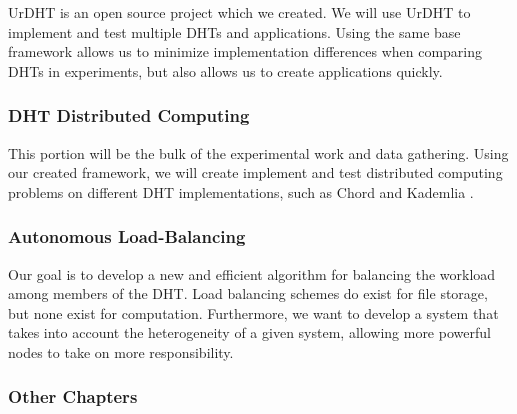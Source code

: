 UrDHT is an open source project which we created.
We will use UrDHT to implement and test multiple DHTs and applications.
Using the same base framework allows us to minimize implementation differences when comparing DHTs in experiments, but also allows us to create applications quickly.



\subsubsection{DHT Distributed Computing}

This portion will be the bulk of the experimental work and data gathering.
Using our created framework, we will create implement and test distributed computing problems on different DHT implementations, such as Chord \cite{chord} and Kademlia \cite{kademlia}.

\subsubsection{Autonomous Load-Balancing}
Our goal is to develop a new and efficient algorithm for balancing the workload among members of the DHT.
Load balancing schemes do exist for file storage, but none exist for computation.
Furthermore, we want to develop a system that takes into account the heterogeneity of a given system, allowing more powerful nodes to take on more responsibility.

\subsubsection{Other Chapters}






